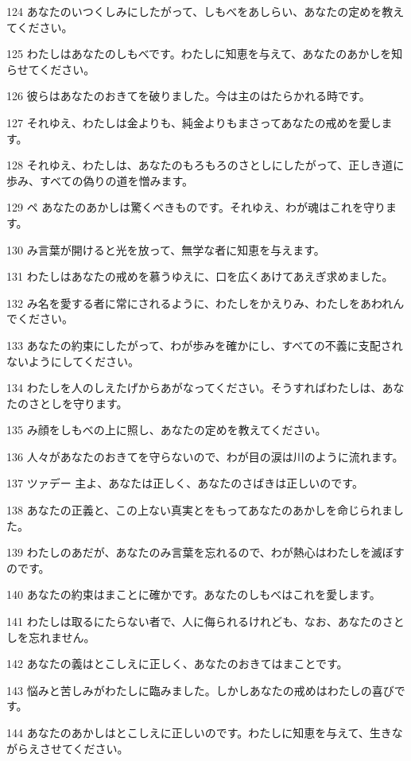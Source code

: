 \par 124 あなたのいつくしみにしたがって、しもべをあしらい、あなたの定めを教えてください。
\par 125 わたしはあなたのしもべです。わたしに知恵を与えて、あなたのあかしを知らせてください。
\par 126 彼らはあなたのおきてを破りました。今は主のはたらかれる時です。
\par 127 それゆえ、わたしは金よりも、純金よりもまさってあなたの戒めを愛します。
\par 128 それゆえ、わたしは、あなたのもろもろのさとしにしたがって、正しき道に歩み、すべての偽りの道を憎みます。
\par 129 ペ あなたのあかしは驚くべきものです。それゆえ、わが魂はこれを守ります。
\par 130 み言葉が開けると光を放って、無学な者に知恵を与えます。
\par 131 わたしはあなたの戒めを慕うゆえに、口を広くあけてあえぎ求めました。
\par 132 み名を愛する者に常にされるように、わたしをかえりみ、わたしをあわれんでください。
\par 133 あなたの約束にしたがって、わが歩みを確かにし、すべての不義に支配されないようにしてください。
\par 134 わたしを人のしえたげからあがなってください。そうすればわたしは、あなたのさとしを守ります。
\par 135 み顔をしもべの上に照し、あなたの定めを教えてください。
\par 136 人々があなたのおきてを守らないので、わが目の涙は川のように流れます。
\par 137 ツァデー 主よ、あなたは正しく、あなたのさばきは正しいのです。
\par 138 あなたの正義と、この上ない真実とをもってあなたのあかしを命じられました。
\par 139 わたしのあだが、あなたのみ言葉を忘れるので、わが熱心はわたしを滅ぼすのです。
\par 140 あなたの約束はまことに確かです。あなたのしもべはこれを愛します。
\par 141 わたしは取るにたらない者で、人に侮られるけれども、なお、あなたのさとしを忘れません。
\par 142 あなたの義はとこしえに正しく、あなたのおきてはまことです。
\par 143 悩みと苦しみがわたしに臨みました。しかしあなたの戒めはわたしの喜びです。
\par 144 あなたのあかしはとこしえに正しいのです。わたしに知恵を与えて、生きながらえさせてください。
